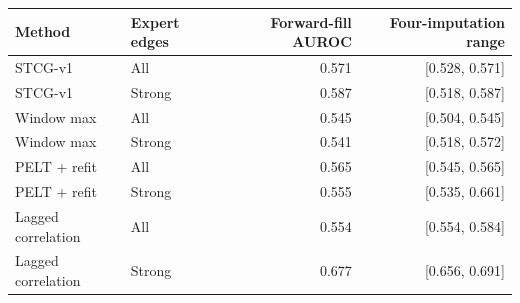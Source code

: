 \begin{tabular}{llrr}
\toprule
Method & Expert edges & Forward-fill AUROC & Four-imputation range \\
\midrule
STCG-v1 & All & 0.571 & [0.528, 0.571] \\
STCG-v1 & Strong & 0.587 & [0.518, 0.587] \\
Window max & All & 0.545 & [0.504, 0.545] \\
Window max & Strong & 0.541 & [0.518, 0.572] \\
PELT + refit & All & 0.565 & [0.545, 0.565] \\
PELT + refit & Strong & 0.555 & [0.535, 0.661] \\
Lagged correlation & All & 0.554 & [0.554, 0.584] \\
Lagged correlation & Strong & 0.677 & [0.656, 0.691] \\
\bottomrule
\end{tabular}
